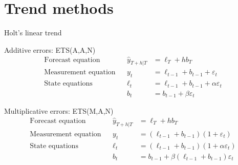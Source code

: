 \documentclass[
  14pt,
  ignorenonframetext,
  aspectratio=169,
]{beamer}
\begin{document}
\section{Trend methods}\label{trend-methods}

\begin{frame}{Holt's linear trend}
\protect{}\label{holts-linear-trend}
\fontsize{13}{15}\sf

\begin{block}{Additive errors: ETS(A,A,N)}\vspace*{-0.7cm}
\begin{align*}
\text{Forecast equation}&& \hat{y}_{T+h|T} &= \ell_T + hb_T\\
\text{Measurement equation}&& y_t &= \ell_{t-1}+b_{t-1}+\varepsilon_t\\
\text{State equations}&&       \ell_t&=\ell_{t-1}+b_{t-1}+\alpha \varepsilon_t\\
&&      b_t&=b_{t-1}+\beta \varepsilon_t
\end{align*}
\end{block}
\pause

\begin{block}{Multiplicative errors: ETS(M,A,N)}\vspace*{-0.7cm}
\begin{align*}
\text{Forecast equation}&& \hat{y}_{T+h|T} &= \ell_T + hb_T\\
\text{Measurement equation}&& y_t &= (\ell_{t-1}+b_{t-1})(1+\varepsilon_t)\\
\text{State equations}&&       \ell_t&=(\ell_{t-1}+b_{t-1})(1+\alpha \varepsilon_t)\\
&&      b_t&=b_{t-1}+\beta (\ell_{t-1}+b_{t-1})\varepsilon_t
\end{align*}
\end{block}
\end{frame}
\end{document}
